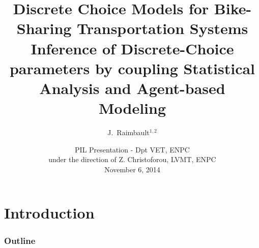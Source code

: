 \documentclass[english,10pt]{beamer}
\begin{document}
\title{Discrete Choice Models for Bike-Sharing Transportation Systems \\ {\small Inference of Discrete-Choice parameters by coupling Statistical Analysis and Agent-based Modeling}}

\author{J.~Raimbault$^{1,2}$}




\date{PIL Presentation - Dpt VET, ENPC \\
under the direction of Z. Christoforou, LVMT, ENPC\\
November 6, 2014}

\frame{\maketitle}


\section{Introduction}

\begin{frame}
\frametitle{Outline}
\tableofcontents{}
\end{frame}
\end{document}
